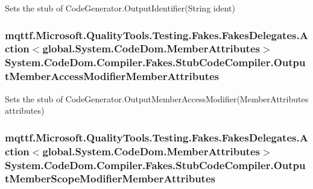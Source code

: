 Sets the stub of Code\-Generator.\-Output\-Identifier(\-String ident)

\hypertarget{class_system_1_1_code_dom_1_1_compiler_1_1_fakes_1_1_stub_code_compiler_ae3a7d65f3d242c6d0d52b3707ce3661d}{
\subsubsection[{Output\-Member\-Access\-Modifier\-Member\-Attributes}]{\setlength{\rightskip}{0pt plus 5cm}mqttf.\-Microsoft.\-Quality\-Tools.\-Testing.\-Fakes.\-Fakes\-Delegates.\-Action$<$global.\-System.\-Code\-Dom.\-Member\-Attributes$>$ System.\-Code\-Dom.\-Compiler.\-Fakes.\-Stub\-Code\-Compiler.\-Output\-Member\-Access\-Modifier\-Member\-Attributes}}\label{class_system_1_1_code_dom_1_1_compiler_1_1_fakes_1_1_stub_code_compiler_ae3a7d65f3d242c6d0d52b3707ce3661d}


Sets the stub of Code\-Generator.\-Output\-Member\-Access\-Modifier(\-Member\-Attributes attributes)

\hypertarget{class_system_1_1_code_dom_1_1_compiler_1_1_fakes_1_1_stub_code_compiler_a999f3cb1ac596175f262deb55a795fa0}{
\subsubsection[{Output\-Member\-Scope\-Modifier\-Member\-Attributes}]{\setlength{\rightskip}{0pt plus 5cm}mqttf.\-Microsoft.\-Quality\-Tools.\-Testing.\-Fakes.\-Fakes\-Delegates.\-Action$<$global.\-System.\-Code\-Dom.\-Member\-Attributes$>$ System.\-Code\-Dom.\-Compiler.\-Fakes.\-Stub\-Code\-Compiler.\-Output\-Member\-Scope\-Modifier\-Member\-Attributes}}\label{class_system_1_1_code_dom_1_1_compiler_1_1_fakes_1_1_stub_code_compiler_a999f3cb1ac596175f262deb55a795fa0}


